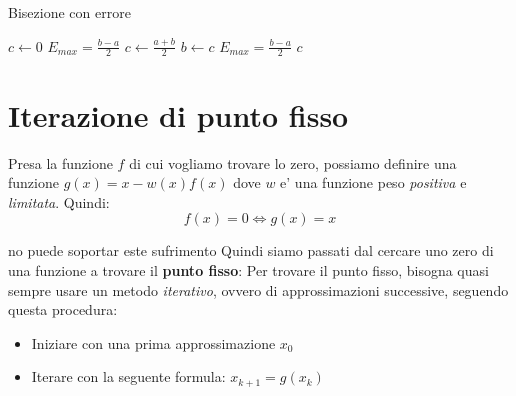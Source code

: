 \vspace{3mm}
\begin{algorithm}[H]
\caption{Bisezione con errore}
\SetAlgoLined
\SetNoFillComment
\vspace{3mm}
$c \leftarrow 0$\;
$ E_{max} = \frac{b-a}{2} $\;
 {
    $ c \gets \frac{a+b}{2} $\;
     {
      $ b \gets c $
    }
    $ E_{max} = \frac{b-a}{2} $
}
\Return $ c $
\end{algorithm}

\section{Iterazione di punto fisso}
Presa la funzione $ f $ di cui vogliamo trovare lo zero, possiamo definire una funzione $ g(x) = x-w(x)f(x) $ dove $ w $ e' una funzione peso \textit{positiva} e \textit{limitata}. Quindi:
\[
  f(x) = 0 \iff g(x) = x
\]

    no puede soportar este sufrimento
Quindi siamo passati dal cercare uno zero di una funzione a trovare il \textbf{punto fisso}:
Per trovare il punto fisso, bisogna quasi sempre usare un metodo \textit{iterativo}, ovvero di approssimazioni successive, seguendo questa procedura:
\begin{itemize}
\item Iniziare con una prima approssimazione $ x_0 $
\item Iterare con la seguente formula: $ x_{k+1} = g(x_{k}) $
\end{itemize}

